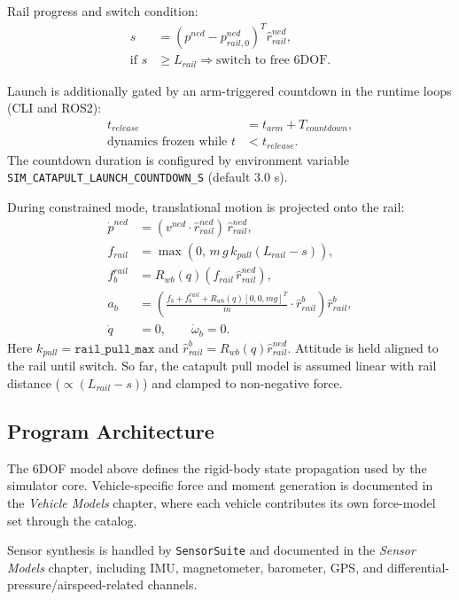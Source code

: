 \documentclass[11pt,a4paper]{article}
\begin{document}
Rail progress and switch condition:
\begin{align}
s &= (p^{ned} - p_{rail,0}^{ned})^T \hat r_{rail}^{ned}, \\
\text{if } s &\ge L_{rail} \Rightarrow \text{switch to free 6DOF.}
\end{align}

Launch is additionally gated by an arm-triggered countdown in the runtime loops (CLI and ROS2):
\begin{align}
t_{release} &= t_{arm} + T_{countdown}, \\
\text{dynamics frozen while } t &< t_{release}.
\end{align}
The countdown duration is configured by environment variable
\texttt{SIM\_CATAPULT\_LAUNCH\_COUNTDOWN\_S} (default $3.0$ s).

During constrained mode, translational motion is projected onto the rail:
\begin{align}
\dot p^{ned} &= (v^{ned}\cdot \hat r_{rail}^{ned})\,\hat r_{rail}^{ned}, \\
f_{rail} &= \max\left(0,\,m\,g\,k_{pull}(L_{rail}-s)\right), \\
f_b^{rail} &= R_{wb}(q)\left(f_{rail}\,\hat r_{rail}^{ned}\right), \\
a_b &= \left(\frac{f_b + f_b^{rail} + R_{wb}(q)[0,0,mg]^T}{m}\cdot \hat r_{rail}^{b}\right)\hat r_{rail}^{b}, \\
\dot q &= 0, \qquad \dot\omega_b = 0.
\end{align}
Here $k_{pull}=\texttt{rail\_pull\_max}$ and $\hat r_{rail}^{b}=R_{wb}(q)\hat r_{rail}^{ned}$. Attitude is held aligned to the rail until switch.
So far, the catapult pull model is assumed linear with rail distance ($\propto (L_{rail}-s)$) and clamped to non-negative force.

\subsection{Program Architecture}
The 6DOF model above defines the rigid-body state propagation used by the simulator core. Vehicle-specific force and moment generation is documented in the \textit{Vehicle Models} chapter, where each vehicle contributes its own force-model set through the catalog.

Sensor synthesis is handled by \texttt{SensorSuite} and documented in the \textit{Sensor Models} chapter, including IMU, magnetometer, barometer, GPS, and differential-pressure/airspeed-related channels.
\end{document}
